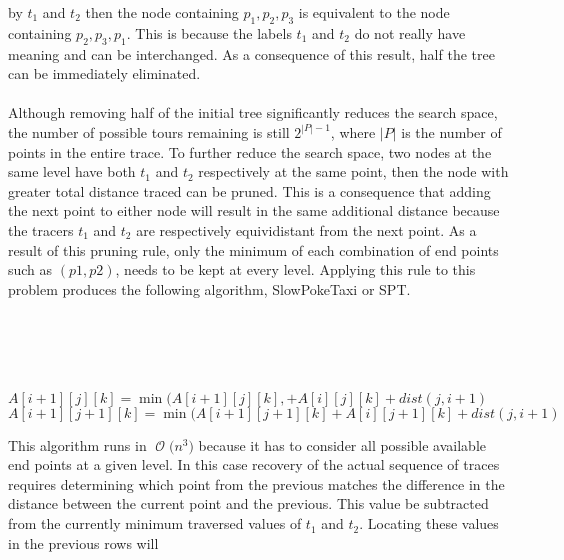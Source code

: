 \documentclass[12pt]{article}
\newcommand{\BigO}[1]{\ensuremath{\operatorname{\mathcal{O}}\bigl(#1\bigr)}}
\begin{document}
by $t_1$ and $t_2$ then the node containing ${{p_1},{p_2,p_3}}$
is equivalent to the node containing ${{p_2,p_3},{p_1}}$.  This
is because the labels $t_1$ and $t_2$ do not really have meaning
and can be interchanged.  As a consequence of this result, half the
tree can be immediately eliminated.\\\\
Although removing half of the initial tree significantly reduces
the search space, the number of possible tours remaining is still
$2^{|P|-1}$, where $|P|$ is the number of points in the entire 
trace.  To further reduce the search space, two nodes at the same
level have both $t_1$ and $t_2$ respectively at the same point, then
the node with greater total distance traced can be pruned.  This is
a consequence that adding the next point to either node will result
in the same additional distance because the tracers $t_1$ and $t_2$
are respectively equividistant from the next point.  As a result
of this pruning rule, only the minimum of each combination of end points
such as $(p1,p2)$, needs to be kept at every level.  Applying this
rule to this problem produces the following algorithm, SlowPokeTaxi or
SPT\@.\\\\
\begin{algorithm}[H]
\\
\\
\\
 {
     {
         {
             {
                $A[i+1][j][k] = \min(A[i+1][j][k], + A[i][j][k] + dist(j,i+1)$\\
                $A[i+1][j+1][k] = \min(A[i+1][j+1][k] + A[i][j+1][k] + dist(j,i+1)$\\
            }
        }
    }
}
\end{algorithm}
This algorithm runs in \BigO{n^3} because it has to consider all
possible available end points at a given level.  In this case
recovery of the actual sequence of traces requires determining
which point from the previous matches the difference in the 
distance between the current point and the previous.  This value
be subtracted from the currently minimum traversed values of $t_1$
and $t_2$.  Locating these values in the previous rows will 
\end{document}
